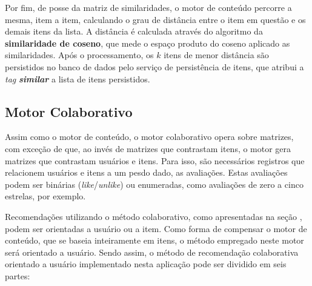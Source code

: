\documentclass[12pt, openright, oneside, a4paper, brazil]{abntex2}
\begin{document}
Por fim, de posse da matriz de similaridades, o motor de conteúdo percorre a mesma, item a item, calculando o grau de distância entre o item em questão e os demais itens da lista. A distância é calculada através do algoritmo da \textbf{similaridade de coseno}, que mede o espaço produto do coseno aplicado as similaridades. Após o processamento, os $k$ itens de menor distância são persistidos no banco de dados pelo serviço de persistência de itens, que atribui a \textit{tag} \textbf{\textit{similar}} a lista de itens persistidos.

\subsection{Motor Colaborativo} \label{motor:colaborativo}

Assim como o motor de conteúdo, o motor colaborativo opera sobre matrizes, com exceção de que, ao invés de matrizes que contrastam itens, o motor gera matrizes que contrastam usuários e itens. Para isso, são necessários registros que relacionem usuários e itens a um pesdo dado, as avaliações. Estas avaliações podem ser binárias (\textit{like}/\textit{unlike}) ou enumeradas, como avaliações de zero a cinco estrelas, por exemplo.

Recomendações utilizando o método colaborativo, como apresentadas na seção , podem ser orientadas a usuário ou a item. Como forma de compensar o motor de conteúdo, que se baseia inteiramente em itens, o método empregado neste motor será orientado a usuário. Sendo assim, o método de recomendação colaborativa orientado a usuário implementado nesta aplicação pode ser dividido em seis partes:
\end{document}
